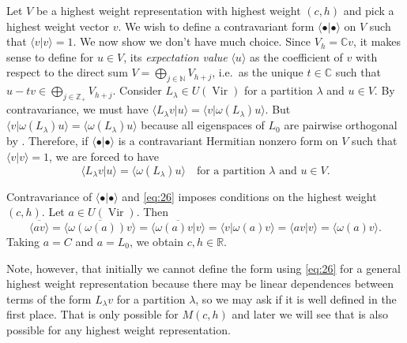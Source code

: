 \documentclass[a4paper, 12pt, reqno]{amsart}
\theoremstyle{remark}
\numberwithin{equation}{subsection}
\DeclareMathOperator{\Vir}{Vir}
\begin{document}
Let $V$ be a highest weight representation with highest weight $(c, h)$ and pick a highest weight vector $v$.
We wish to define a contravariant form $\langle \bullet| \bullet\rangle$ on $V$ such that $\langle v| v\rangle = 1$.
We now show we don't have much choice.
Since $V_h = \mathbb{C}v$, it makes sense to define for $u \in V$, its \emph{expectation value} $\langle u\rangle$ as the coefficient of $v$ with respect to the direct sum $V = \bigoplus_{j \in \mathbb{N}}V_{h + j}$, i.e.\ as the unique $t \in \mathbb{C}$ such that $u - tv \in \bigoplus_{j \in \mathbb{Z}_+}V_{h + j}$.
Consider $L_{\lambda} \in U(\Vir)$ for a partition $\lambda$ and $u \in V$.
By contravariance, we must have $\langle L_{\lambda}v| u\rangle = \langle v| \omega(L_{\lambda})u\rangle$.
But $\langle v| \omega(L_{\lambda})u\rangle = \langle \omega(L_{\lambda})u\rangle$ because all eigenspaces of $L_0$ are pairwise orthogonal by .
Therefore, if $\langle \bullet| \bullet\rangle$ is a contravariant Hermitian nonzero form on $V$ such that $\langle v| v\rangle = 1$, we are forced to have
\begin{equation}
  \label{eq:26}
  \langle L_{\lambda}v| u\rangle = \langle \omega(L_{\lambda})u\rangle \quad \text{for a partition }\lambda\text{ and }u \in V.
\end{equation}

Contravariance of $\langle \bullet| \bullet\rangle$ and \eqref{eq:26} imposes conditions on the highest weight $(c, h)$.
Let $a \in U(\Vir)$.
Then
\begin{equation*}
  \overline{\langle av\rangle} = \overline{\langle \omega(\omega(a))v\rangle} = \overline{\langle \omega(a)v| v\rangle} = \langle v| \omega(a)v\rangle = \langle av| v\rangle = \langle \omega(a)v\rangle.
\end{equation*}
Taking $a = C$ and $a = L_0$, we obtain $c, h \in \mathbb{R}$.

Note, however, that initially we cannot define the form using \eqref{eq:26} for a general highest weight representation because there may be linear dependences between terms of the form $L_{\lambda}v$ for a partition $\lambda$, so we may ask if it is well defined in the first place.
That is only possible for $M(c, h)$ and later we will see that is also possible for any highest weight representation.
\end{document}
